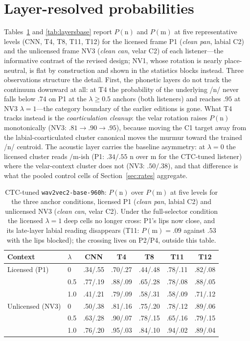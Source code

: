 \documentclass[11pt,a4paper]{article}
\newcommand{\sampa}[1]{\texttt{#1}}
\newcommand{\lam}{\lambda}
\begin{document}
\section{Layer-resolved probabilities}
\label{sec:layers}

Tables~\ref{tab:layers960} and \ref{tab:layersbase} report
$P(\mathrm{n})$ and $P(\mathrm{m})$ at five representative levels
(CNN, T4, T8, T11, T12) for the licensed frame P1 (\emph{clean pan},
labial C2) and the unlicensed frame NV3 (\emph{clean can}, velar C2)
of each listener---the informative contrast of the revised design;
NV1, whose rotation is nearly place-neutral, is flat by construction
and shown in the statistics blocks instead. Three observations
structure the detail. First, the phonetic layers do not track the
continuum downward at all: at T4 the probability of the underlying
/n/ never falls below $.74$ on P1 at the $\lam \geq 0.5$ anchors
(both listeners) and reaches $.95$ at NV3 $\lam=1$---the category
boundary of the earlier editions is gone. What T4 tracks instead is the \emph{coarticulation cleanup}:
the velar rotation raises $P(\mathrm{n})$ monotonically (NV3:
$.81 \rightarrow .90 \rightarrow .95$), because moving the C1 target
away from the labial-coarticulated cluster canonical moves the murmur
toward the trained /n/ centroid. The acoustic layer carries the
baseline asymmetry: at $\lam=0$ the licensed cluster reads
$/\mathrm{m}$-ish (P1: $.34/.55$ n over m for the CTC-tuned
listener) where the velar-context cluster does not (NV3:
$.50/.38$), and that difference is what the pooled control cells of
Section~\ref{sec:rates} aggregate.

\begin{table}[t]
\small
\centering
\begin{tabular}{@{}llccccc@{}}
\toprule
Context & $\lam$ & CNN & T4 & T8 & T11 & T12 \\
\midrule
Licensed (P1) & 0 & .34/.55 & .70/.27 & .44/.48 & .78/.11 & .82/.08 \\
 & 0.5 & .77/.19 & .88/.09 & .65/.28 & .78/.08 & .88/.05 \\
 & 1.0 & .41/.21 & .79/.09 & .58/.31 & .58/.09 & .71/.12 \\
\addlinespace
Unlicensed (NV3) & 0 & .50/.38 & .81/.16 & .75/.20 & .78/.12 & .89/.06 \\
 & 0.5 & .63/.28 & .90/.07 & .78/.15 & .65/.16 & .79/.15 \\
 & 1.0 & .76/.20 & .95/.03 & .84/.10 & .94/.02 & .89/.04 \\
\bottomrule
\end{tabular}
\caption{CTC-tuned \sampa{wav2vec2-base-960h}: $P(\mathrm{n})$
over $P(\mathrm{m})$ at five levels for the three anchor conditions,
licensed P1 (\emph{clean pan}, labial C2) and unlicensed NV3
(\emph{clean can}, velar C2). Under the full-selector condition the
licensed $\lam=1$ deep cells no longer cross: P1's lips now close,
and its late-layer labial reading disappears (T11: $P(\mathrm{m})
= .09$ against $.53$ with the lips blocked); the crossing lives on
P2/P4, outside this table.}
\label{tab:layers960}
\end{table}
\end{document}
